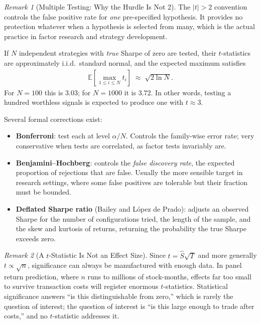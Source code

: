 \documentclass[11pt]{article}
\theoremstyle{definition}
\theoremstyle{plain}
\theoremstyle{remark}
\newtheorem{remark}{Remark}[section]
\begin{document}
\begin{remark}[Multiple Testing: Why the Hurdle Is Not 2]
    The $|t| > 2$ convention controls the false positive rate for \emph{one} pre-specified hypothesis. It provides no protection whatever when a hypothesis is selected from many, which is the actual practice in factor research and strategy development.

    If $N$ independent strategies with \emph{true} Sharpe of zero are tested, their $t$-statistics are approximately i.i.d.\ standard normal, and the expected maximum satisfies
    \begin{align}
        \mathbb{E}\left[\max_{1\leq i\leq N} t_i\right] \;\approx\; \sqrt{2\ln N}.
    \end{align}
    For $N = 100$ this is $3.03$; for $N = 1000$ it is $3.72$. In other words, testing a hundred worthless signals is expected to produce one with $t \approx 3$.

    Several formal corrections exist:
    \begin{itemize}[noitemsep]
        \item \textbf{Bonferroni}: test each at level $\alpha/N$. Controls the family-wise error rate; very conservative when tests are correlated, as factor tests invariably are.
        \item \textbf{Benjamini--Hochberg}: controls the \emph{false discovery rate}, the expected proportion of rejections that are false. Usually the more sensible target in research settings, where some false positives are tolerable but their fraction must be bounded.
        \item \textbf{Deflated Sharpe ratio} (Bailey and L\'opez de Prado): adjusts an observed Sharpe for the number of configurations tried, the length of the sample, and the skew and kurtosis of returns, returning the probability the true Sharpe exceeds zero.
    \end{itemize}
\end{remark}

\begin{remark}[A $t$-Statistic Is Not an Effect Size]
    Since $t = \hat{S}\sqrt{T}$ and more generally $t \propto \sqrt{n}$, significance can always be manufactured with enough data. In panel return prediction, where $n$ runs to millions of stock-months, effects far too small to survive transaction costs will register enormous $t$-statistics. Statistical significance answers ``is this distinguishable from zero,'' which is rarely the question of interest; the question of interest is ``is this large enough to trade after costs,'' and no $t$-statistic addresses it.
\end{remark}
\end{document}
